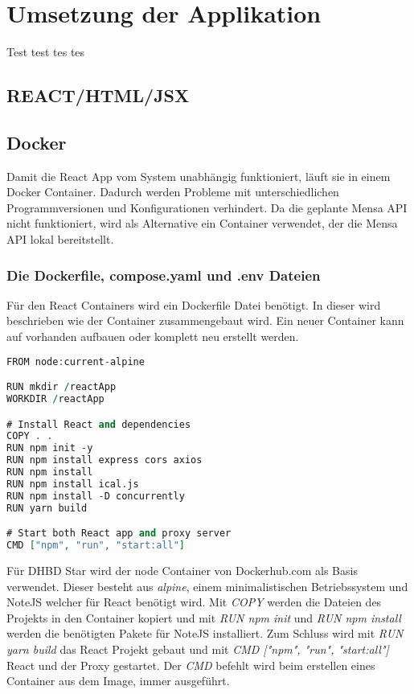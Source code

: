\chapter{Umsetzung der Applikation}
Test test tes tes 

\section{REACT/HTML/JSX}


\section{Docker}

Damit die React App vom System unabhängig funktioniert, läuft sie in einem Docker Container. Dadurch werden Probleme mit unterschiedlichen Programmversionen und Konfigurationen verhindert.
Da die geplante Mensa API nicht funktioniert, wird als Alternative ein Container verwendet, der die Mensa API lokal bereitstellt.

\subsection{Die Dockerfile, compose.yaml und .env Dateien}

Für den React Containers wird ein Dockerfile Datei benötigt. In dieser wird beschrieben wie der Container zusammengebaut wird. Ein neuer Container kann auf vorhanden aufbauen oder komplett neu erstellt werden.

\begin{lstlisting}[language=vhdl,
	frame=single,           % Ein Rahmen um den Code
	framexleftmargin=15pt,  % Rahmen link von den Zahlen
	style=algoBericht,
	label={Dockerfile},
	captionpos=b           % Caption unter den Code setzen
	caption={Dockerfile für DHBW-Star}]
FROM node:current-alpine

RUN mkdir /reactApp
WORKDIR /reactApp

# Install React and dependencies
COPY . .
RUN npm init -y
RUN npm install express cors axios
RUN npm install
RUN npm install ical.js
RUN npm install -D concurrently
RUN yarn build

# Start both React app and proxy server
CMD ["npm", "run", "start:all"]
\end{lstlisting}

Für DHBD Star wird der node Container von Dockerhub.com als Basis verwendet. Dieser besteht aus \emph{alpine}, einem minimalistischen Betriebssystem und NoteJS welcher für React benötigt wird.
Mit \emph{COPY} werden die Dateien des Projekts in den Container kopiert und mit \emph{RUN npm init} und \emph{RUN npm install} werden die benötigten Pakete für NoteJS installiert.
Zum Schluss wird mit \emph{RUN yarn build} das React Projekt gebaut und mit \emph{CMD ["npm", "run", "start:all"]} React und der Proxy gestartet. Der \emph{CMD} befehlt wird beim erstellen eines Container aus dem Image, immer ausgeführt. 

